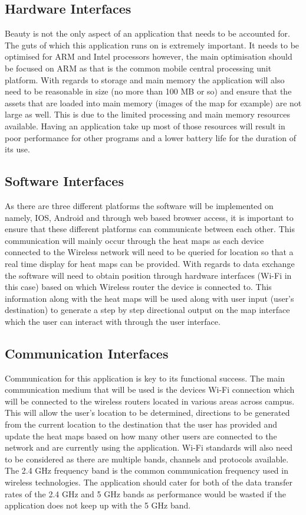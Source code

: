 \documentclass[11pt]{article}
\begin{document}
\subsection{Hardware Interfaces}
Beauty is not the only aspect of an application that needs to be accounted for. The guts of which this application runs on is extremely important. It needs to be optimised for ARM and Intel processors however, the main optimisation should be focused on ARM as that is the common mobile central processing unit platform. With regards to storage and main memory the application will also need to be reasonable in size (no more than 100 MB or so) and ensure that the assets that are loaded into main memory (images of the map for example) are not large as well. This is due to the limited processing and main memory resources available. Having an application take up most of those resources will result in poor performance for other programs and a lower battery life for the duration of its use. 

\subsection{Software Interfaces}
As there are three different platforms the software will be implemented on namely, IOS, Android and through web based browser access, it is important to ensure that these different platforms can communicate between each other. This communication will mainly occur through the heat maps as each device connected to the Wireless network will need to be queried for location so that a real time display for heat maps can be provided. With regards to data exchange the software will need to obtain position through hardware interfaces (Wi-Fi in this case) based on which Wireless router the device is connected to. This information along with the heat maps will be used along with user input (user’s destination) to generate a step by step directional output on the map interface which the user can interact with through the user interface.

\subsection{Communication Interfaces}
Communication for this application is key to its functional success. The main communication medium that will be used is the devices Wi-Fi connection which will be connected to the wireless routers located in various areas across campus. This will allow the user’s location to be determined, directions to be generated from the current location to the destination that the user has provided and update the heat maps based on how many other users are connected to the network and are currently using the application. Wi-Fi standards will also need to be considered as there are multiple bands, channels and protocols available. The 2.4 GHz frequency band is the common communication frequency used in wireless technologies. The application should cater for both of the data transfer rates of the 2.4 GHz and 5 GHz bands as performance would be wasted if the application does not keep up with the 5 GHz band.
\end{document}
